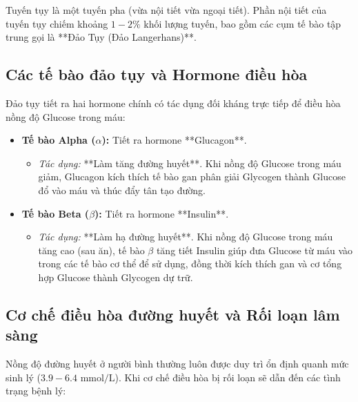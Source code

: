 Tuyến tụy là một tuyến pha (vừa nội tiết vừa ngoại tiết). Phần nội tiết của tuyến tụy chiếm khoảng $1 - 2\%$ khối lượng tuyến, bao gồm các cụm tế bào tập trung gọi là **Đảo Tụy (Đảo Langerhans)**.

\subsection{Các tế bào đảo tụy và Hormone điều hòa}

Đảo tụy tiết ra hai hormone chính có tác dụng đối kháng trực tiếp để điều hòa nồng độ Glucose trong máu:

\begin{itemize}
    \item \textbf{Tế bào Alpha ($\alpha$):} Tiết ra hormone **Glucagon**.
    \begin{itemize}
        \item \textit{Tác dụng:} **Làm tăng đường huyết**. Khi nồng độ Glucose trong máu giảm, Glucagon kích thích tế bào gan phân giải Glycogen thành Glucose đổ vào máu và thúc đẩy tân tạo đường.
    \end{itemize}

    \item \textbf{Tế bào Beta ($\beta$):} Tiết ra hormone **Insulin**.
    \begin{itemize}
        \item \textit{Tác dụng:} **Làm hạ đường huyết**. Khi nồng độ Glucose trong máu tăng cao (sau ăn), tế bào $\beta$ tăng tiết Insulin giúp đưa Glucose từ máu vào trong các tế bào cơ thể để sử dụng, đồng thời kích thích gan và cơ tổng hợp Glucose thành Glycogen dự trữ.
    \end{itemize}
\end{itemize}

\subsection{Cơ chế điều hòa đường huyết và Rối loạn lâm sàng}

Nồng độ đường huyết ở người bình thường luôn được duy trì ổn định quanh mức sinh lý ($3.9 - 6.4\text{ mmol/L}$). Khi cơ chế điều hòa bị rối loạn sẽ dẫn đến các tình trạng bệnh lý:

